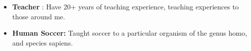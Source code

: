 
\begin{itemize}
    \item \textbf{Teacher} : Have 20+ years of teaching experience, teaching experiences to those around me.
    \item \textbf{Human Soccer:} Taught soccer to a particular organism of the genus homo, and species sapiens.
\end{itemize}